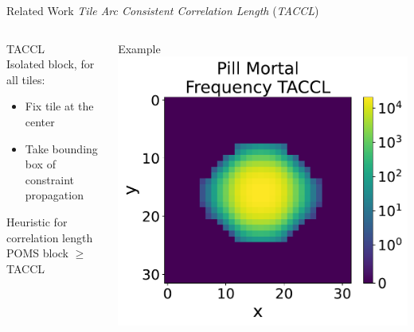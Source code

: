 \documentclass{beamer}
\begin{document}

  \begin{frame}[fragile]{Related Work}
    \textit{Tile Arc Consistent Correlation Length} (\textit{TACCL})
    \begin{columns}[T,onlytextwidth]
        \begin{block}{TACCL}
          \hfill \\
          Isolated block, for all tiles:
          \begin{itemize}
            \item Fix tile at the center
            \item Take bounding box of constraint propagation
          \end{itemize}

          Heuristic for correlation length \\
          POMS block $\ge$ TACCL
        \end{block}
        \begin{block}{Example}
          \includegraphics[width=1.125\textwidth]{img/pm_freq_taccl.pdf}
        \end{block}
    \end{columns}
  \end{frame}
\end{document}
